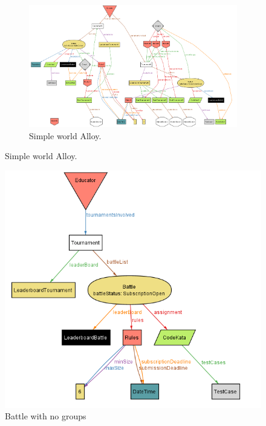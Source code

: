 \begin{figure}
    \begin{figure} [H]
        \begin{center}
            \includegraphics[width=1\linewidth]{misc/Images/AlloySims/showSomeRealistic.png}
            \caption{Simple world Alloy.}
        \end{center}
    \end{figure}
\end{figure}


\begin{figure}
    \centering
    \includegraphics[width=1\linewidth]{misc//Images//AlloySims/noGroupBattle.png}
    \caption{Battle with no groups}
\end{figure}

